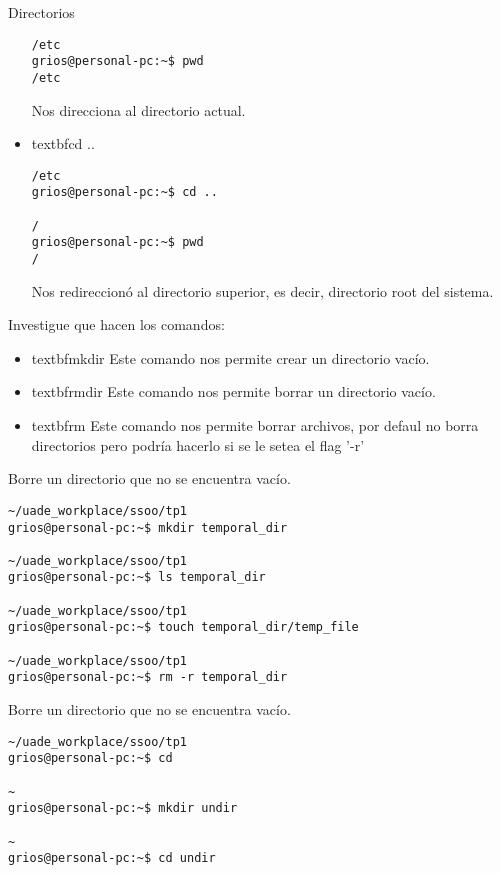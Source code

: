 \begin{section}{Directorios}
\begin{itemize}
\begin{lstlisting}[style=Ubuntu]
/etc
grios@personal-pc:~$ pwd
/etc
\end{lstlisting}
Nos direcciona al directorio actual.

\item textbf{cd ..}
\begin{lstlisting}[style=Ubuntu]
/etc
grios@personal-pc:~$ cd ..

/
grios@personal-pc:~$ pwd
/
\end{lstlisting}
Nos redireccionó al directorio superior, es decir, directorio root del sistema.
\end{itemize}


\begin{quoting}
Investigue que hacen los comandos:
\end{quoting}

\begin{itemize}
\item textbf{mkdir}
Este comando nos permite crear un directorio vacío.
\item textbf{rmdir}
Este comando nos permite borrar un directorio vacío.
\item textbf{rm}
Este comando nos permite borrar archivos, por defaul no borra directorios pero podría hacerlo si se le setea el flag '-r'
\end{itemize}


\begin{quoting}
Borre un directorio que no se encuentra vacío.
\end{quoting}
\begin{lstlisting}[style=Ubuntu]
~/uade_workplace/ssoo/tp1
grios@personal-pc:~$ mkdir temporal_dir

~/uade_workplace/ssoo/tp1
grios@personal-pc:~$ ls temporal_dir 

~/uade_workplace/ssoo/tp1
grios@personal-pc:~$ touch temporal_dir/temp_file

~/uade_workplace/ssoo/tp1
grios@personal-pc:~$ rm -r temporal_dir
\end{lstlisting}

\begin{quoting}
Borre un directorio que no se encuentra vacío.
\end{quoting}
\begin{lstlisting}[style=Ubuntu]
~/uade_workplace/ssoo/tp1
grios@personal-pc:~$ cd

~
grios@personal-pc:~$ mkdir undir

~
grios@personal-pc:~$ cd undir

\end{lstlisting}



\end{section}
